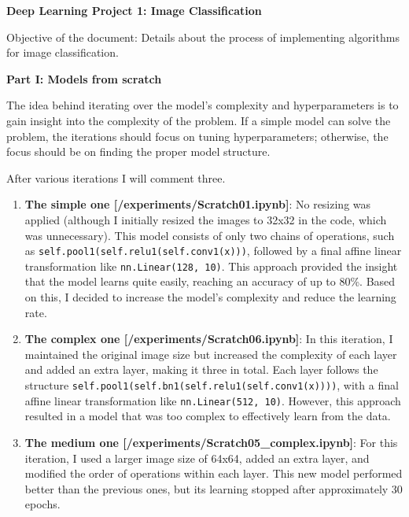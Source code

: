\documentclass{cpsc202}
\begin{document}
    \centerline{\Large\textbf{Deep Learning Project 1: Image Classification}}

    Objective of the document: Details about the process of implementing algorithms for image classification.

    \large\textbf{Part I: Models from scratch}

    The idea behind iterating over the model's complexity and hyperparameters is to gain insight into the complexity of the problem.
    If a simple model can solve the problem, the iterations should focus on tuning hyperparameters; otherwise, the focus should be on finding the proper model structure.

    After various iterations I will comment three.
    \begin{enumerate}
        \item \textbf{The simple one [/experiments/Scratch01.ipynb]}: No resizing was applied (although I initially resized the images to 32x32 in the code, which was unnecessary).
        This model consists of only two chains of operations, such as \lstinline|self.pool1(self.relu1(self.conv1(x)))|, followed by a final affine linear transformation like \lstinline|nn.Linear(128, 10)|.
        This approach provided the insight that the model learns quite easily, reaching an accuracy of up to 80\%.
        Based on this, I decided to increase the model's complexity and reduce the learning rate.

        \item \textbf{The complex one [/experiments/Scratch06.ipynb]}: In this iteration, I maintained the original image size but increased the complexity of each layer and added an extra layer, making it three in total.
        Each layer follows the structure \lstinline|self.pool1(self.bn1(self.relu1(self.conv1(x))))|, with a final affine linear transformation like \lstinline|nn.Linear(512, 10)|.
        However, this approach resulted in a model that was too complex to effectively learn from the data.

        \item \textbf{The medium one [/experiments/Scratch05\_complex.ipynb]}: For this iteration, I used a larger image size of 64x64, added an extra layer, and modified the order of operations within each layer.
        This new model performed better than the previous ones, but its learning stopped after approximately 30 epochs.
    \end{enumerate}
\end{document}
